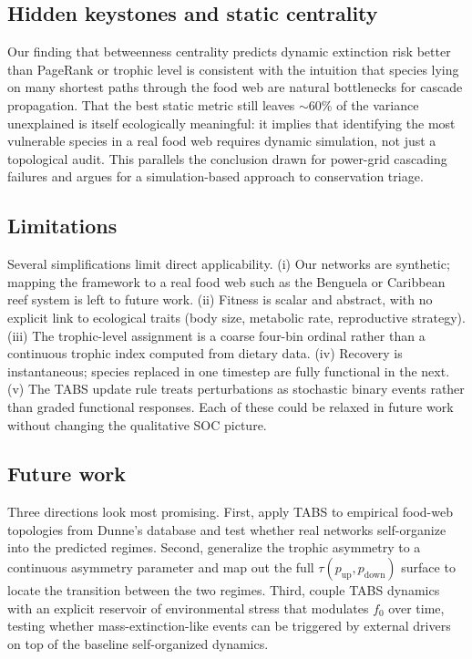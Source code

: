 \documentclass[11pt,a4paper]{article}
\begin{document}
\subsection{Hidden keystones and static centrality}
Our finding that betweenness centrality predicts dynamic extinction risk better than PageRank or trophic level is consistent with the intuition that species lying on many shortest paths through the food web are natural bottlenecks for cascade propagation. That the best static metric still leaves $\sim$60\% of the variance unexplained is itself ecologically meaningful: it implies that identifying the most vulnerable species in a real food web requires dynamic simulation, not just a topological audit. This parallels the conclusion drawn for power-grid cascading failures \citep{dobson2007complex} and argues for a simulation-based approach to conservation triage.

\subsection{Limitations}
Several simplifications limit direct applicability. (i) Our networks are synthetic; mapping the framework to a real food web such as the Benguela or Caribbean reef system \citep{dunne2002foodweb} is left to future work. (ii) Fitness is scalar and abstract, with no explicit link to ecological traits (body size, metabolic rate, reproductive strategy). (iii) The trophic-level assignment is a coarse four-bin ordinal rather than a continuous trophic index computed from dietary data. (iv) Recovery is instantaneous; species replaced in one timestep are fully functional in the next. (v) The TABS update rule treats perturbations as stochastic binary events rather than graded functional responses. Each of these could be relaxed in future work without changing the qualitative SOC picture.

\subsection{Future work}
Three directions look most promising. First, apply TABS to empirical food-web topologies from Dunne's database \citep{dunne2002foodweb} and test whether real networks self-organize into the predicted regimes. Second, generalize the trophic asymmetry to a continuous asymmetry parameter and map out the full $\tau(p_{\text{up}}, p_{\text{down}})$ surface to locate the transition between the two regimes. Third, couple TABS dynamics with an explicit reservoir of environmental stress that modulates $f_0$ over time, testing whether mass-extinction-like events can be triggered by external drivers on top of the baseline self-organized dynamics.
\end{document}
